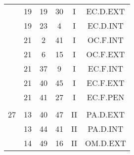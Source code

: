 \documentclass[12pt, a4paper]{article}
\begin{document}
\begin{multicols}{3}
{\begin{tabular}{c c c c c c}
	 	 	 	 & 19 & 19 & 30 & I & EC.D.EXT\\%
	 	 	 	 & 19 & 23 & 4 & I & EC.D.INT\\%
	 	 	 	 & 21 & 2 & 41 & I & OC.F.INT\\%
	 	 	 	 & 21 & 6 & 15 & I & OC.F.EXT\\%
	 	 	 	 & 21 & 37 & 9 & I & EC.F.INT\\%
	 	 	 	 & 21 & 40 & 45 & I & EC.F.EXT\\%
	 	 	 	 & 21 & 41 & 27 & I & EC.F.PEN\\%
	 	 	 	 & & & & & \\%
	 	 	 	27 & 13 & 40 & 47 & II & PA.D.EXT\\%
	 	 	 	 & 13 & 44 & 41 & II & PA.D.INT\\%
	 	 	 	 & 14 & 49 & 16 & II & OM.D.EXT\\%
	 	 \end{tabular}
 	}
\end{multicols}
\end{document}
